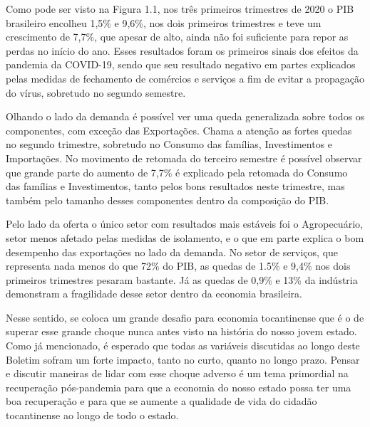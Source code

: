 \begin{figure}[!h]
\begin{subfigure}{\linewidth}
	\end{subfigure}
\end{figure}
\par Como pode ser visto na Figura 1.1, nos três primeiros trimestres de 2020 o PIB brasileiro encolheu 1,5\% e 9,6\%, nos dois primeiros trimestres e teve um crescimento de 7,7\%, que apesar de alto, ainda não foi suficiente para repor as perdas no início do ano. Esses resultados foram os primeiros sinais dos efeitos da pandemia da COVID-19, sendo que seu resultado negativo em partes explicados pelas medidas de fechamento de comércios e serviços a fim de evitar a propagação do vírus, sobretudo no segundo semestre.
\par Olhando o lado da demanda é possível ver uma queda generalizada sobre todos os componentes, com exceção das Exportações. Chama a atenção as fortes quedas no segundo trimestre, sobretudo no Consumo das famílias, Investimentos e Importações. No movimento de retomada do terceiro semestre é possível observar que grande parte do aumento de 7,7\% é explicado pela retomada do Consumo das famílias e Investimentos, tanto pelos bons resultados neste trimestre, mas também pelo tamanho desses componentes dentro da composição do PIB.
\par Pelo lado da oferta o único setor com resultados mais estáveis foi o Agropecuário, setor menos afetado pelas medidas de isolamento, e o que em parte explica o bom desempenho das exportações no lado da demanda. No setor de serviços, que representa nada menos do que 72\% do PIB, as quedas de 1.5\% e 9,4\% nos dois primeiros trimestres pesaram bastante. Já as quedas de 0,9\% e 13\% da indústria demonstram a fragilidade desse setor dentro da economia brasileira.
\par Nesse sentido, se coloca um grande desafio para economia tocantinense que é o de superar esse grande choque nunca antes visto na história do nosso jovem estado. Como já mencionado, é esperado que todas as variáveis discutidas ao longo deste Boletim sofram um forte impacto, tanto no curto, quanto no longo prazo. Pensar e discutir maneiras de lidar com esse choque adverso é um tema primordial na recuperação pós-pandemia para que a economia do nosso estado possa ter uma boa recuperação e para que se aumente a qualidade de vida do cidadão tocantinense ao longo de todo o estado.

